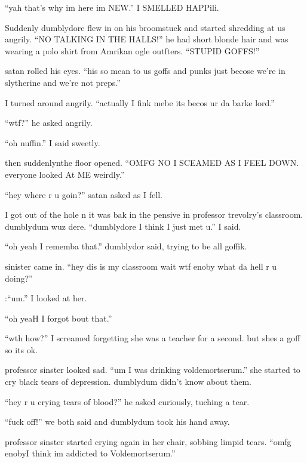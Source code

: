 \enquote{yah that's why im here im NEW.} I SMELLED HAPPili.

Suddenly dumblydore flew in on his broomstuck and started shredding at us angrily. \enquote{NO TALKING IN THE HALLS\@!} he had short blonde hair and was wearing a polo shirt from Amrikan ogle outfters. \enquote{STUPID GOFFS\@!}

satan rolled his eyes. \enquote{his so mean to us goffs and punks just becose we're in slytherine and we're not preps.}

I turned around angrily. \enquote{actually I fink mebe its becos ur da barke lord.}

\enquote{wtf?} he asked angrily.

\enquote{oh nuffin.} I said sweetly.

then suddenlyn\dotfill the floor opened.\newline
\enquote{OMFG NO I SCEAMED AS I FEEL DOWN\@. everyone looked At ME weirdly.}

\enquote{hey where r u goin?} satan asked as I fell.

I got out of the hole n it was bak in the pensive in professor trevolry's classroom. dumblydum wuz dere. \enquote{dumblydore I think I just met u.} I said.

\enquote{oh yeah I rememba that.} dumblydor said, trying to be all goffik.

sinister came in. \enquote{hey dis is my classroom wait wtf enoby what da hell r u doing?}

:\enquote{um.} I looked at her.

\enquote{oh yeaH I forgot bout that.}

\enquote{wth how?} I screamed forgetting she was a teacher for a second. but shes a goff so its ok.

professor sinster looked sad. \enquote{um I was drinking voldemortserum.} she started to cry black tears of depression. dumblydum didn't know about them.

\enquote{hey r u crying tears of blood?} he asked curiously, tuching a tear.

\enquote{fuck off!} we both said and dumblydum took his hand away.

\begin{sloppypar}
    professor sinster started crying again in her chair, sobbing limp\-id tears. \enquote{omfg enoby\dotfill I think im addicted to Voldemortserum.}
\end{sloppypar}

